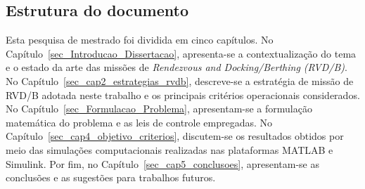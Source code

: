 \subsection{Estrutura do documento}

Esta pesquisa de mestrado foi dividida em cinco capítulos.
No Capítulo~\ref{sec_Introducao_Dissertacao}, apresenta-se a contextualização do tema e o estado da arte das missões de \emph{Rendezvous and Docking/Berthing (RVD/B)}.
No Capítulo~\ref{sec_cap2_estrategias_rvdb}, descreve-se a estratégia de missão de RVD/B adotada neste trabalho e os principais critérios operacionais considerados.
No Capítulo~\ref{sec_Formulacao_Problema}, apresentam-se a formulação matemática do problema e as leis de controle empregadas.
No Capítulo~\ref{sec_cap4_objetivo_criterios}, discutem-se os resultados obtidos por meio das simulações computacionais realizadas nas plataformas MATLAB e Simulink.
Por fim, no Capítulo~\ref{sec_cap5_conclusoes}, apresentam-se as conclusões e as sugestões para trabalhos futuros.
